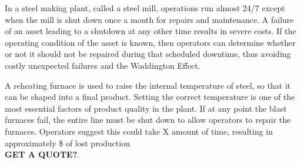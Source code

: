 In a steel making plant, called a steel mill, operations run almost 24/7 except when the mill is shut down once a month for repairs and maintenance.
A failure of an asset leading to a shutdown at any other time results in severe costs.
If the operating condition of the asset is known, then operators can determine whether or not it should not be repaired during that scheduled downtime,
thus avoiding costly unexpected failures and the Waddington Effect.


A reheating furnace is used to raise the internal temperature of steel, so that it can be shaped into a final product.
Setting the correct temperature is one of the most essential factors of product quality in the plant.
If at any point the blast furnaces fail, the entire line must be shut down to allow operators to repair the furnaces.
Operators suggest this could take X amount of time, resulting in approximately \$ of lost production\\
\textbf{GET A QUOTE?}.



